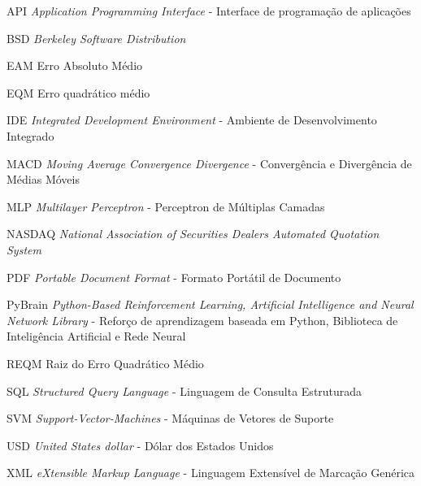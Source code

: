 \begin{siglas}
	\item[API] \textit{Application Programming Interface} - Interface de programação de aplicações
	\item[BSD] \textit{Berkeley Software Distribution}
	\item[EAM] Erro Absoluto Médio
	\item[EQM] Erro quadrático médio
	\item[IDE] \textit{Integrated Development Environment} - Ambiente de Desenvolvimento Integrado
	\item[MACD] \textit{Moving Average Convergence Divergence} - Convergência e Divergência de Médias Móveis
	\item[MLP] \textit{Multilayer Perceptron} - Perceptron de Múltiplas Camadas
	\item[NASDAQ] \textit{National Association of Securities Dealers Automated Quotation System}
	\item[PDF] \textit{Portable Document Format} - Formato Portátil de Documento
	\item[PyBrain] \textit{Python-Based Reinforcement Learning, Artificial Intelligence and Neural Network Library} - Reforço de aprendizagem baseada em Python, Biblioteca de Inteligência Artificial e Rede Neural
	\item[REQM] Raiz do Erro Quadrático Médio
	\item[SQL] \textit{Structured Query Language} - Linguagem de Consulta Estruturada
	\item[SVM] \textit{Support-Vector-Machines } - Máquinas de Vetores de Suporte 
	\item[USD] \textit{United States dollar} - Dólar dos Estados Unidos
	\item[XML] \textit{eXtensible Markup Language} - Linguagem Extensível de Marcação Genérica
\end{siglas}

